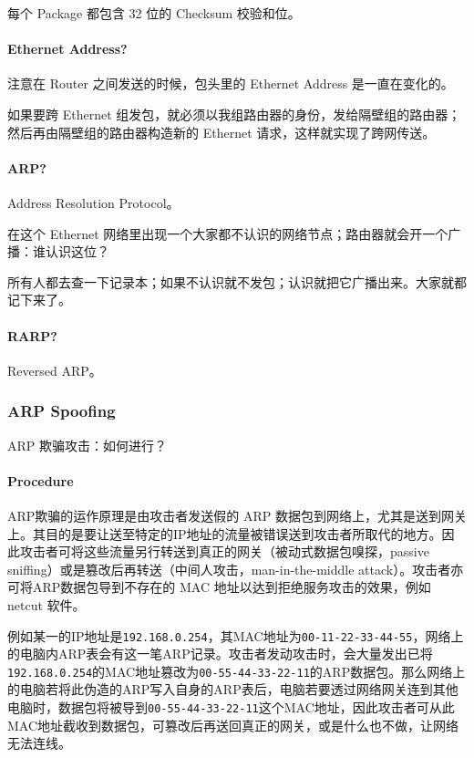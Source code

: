 \documentclass[
]{article}
\begin{document}
每个 Package 都包含 32 位的 Checksum 校验和位。

\hypertarget{header-n110}{%
\paragraph{Ethernet Address?}\label{header-n110}}

注意在 Router 之间发送的时候，包头里的 Ethernet Address 是一直在变化的。

如果要跨 Ethernet
组发包，就必须以我组路由器的身份，发给隔壁组的路由器；然后再由隔壁组的路由器构造新的
Ethernet 请求，这样就实现了跨网传送。

\hypertarget{header-n113}{%
\paragraph{ARP?}\label{header-n113}}

Address Resolution Protocol。

在这个 Ethernet
网络里出现一个大家都不认识的网络节点；路由器就会开一个广播：谁认识这位？

所有人都去查一下记录本；如果不认识就不发包；认识就把它广播出来。大家就都记下来了。

\hypertarget{header-n117}{%
\paragraph{RARP?}\label{header-n117}}

Reversed ARP。

\hypertarget{header-n119}{%
\subsubsection{ARP Spoofing}\label{header-n119}}

ARP 欺骗攻击：如何进行？

\hypertarget{header-n121}{%
\paragraph{Procedure}\label{header-n121}}

ARP欺骗的运作原理是由攻击者发送假的 ARP
数据包到网络上，尤其是送到网关上。其目的是要让送至特定的IP地址的流量被错误送到攻击者所取代的地方。因此攻击者可将这些流量另行转送到真正的网关（被动式数据包嗅探，passive
sniffing）或是篡改后再转送（中间人攻击，man-in-the-middle
attack）。攻击者亦可将ARP数据包导到不存在的 MAC
地址以达到拒绝服务攻击的效果，例如 netcut 软件。

例如某一的IP地址是\texttt{192.168.0.254}，其MAC地址为\texttt{00-11-22-33-44-55}，网络上的电脑内ARP表会有这一笔ARP记录。攻击者发动攻击时，会大量发出已将\texttt{192.168.0.254}的MAC地址篡改为\texttt{00-55-44-33-22-11}的ARP数据包。那么网络上的电脑若将此伪造的ARP写入自身的ARP表后，电脑若要透过网络网关连到其他电脑时，数据包将被导到\texttt{00-55-44-33-22-11}这个MAC地址，因此攻击者可从此MAC地址截收到数据包，可篡改后再送回真正的网关，或是什么也不做，让网络无法连线。
\end{document}
